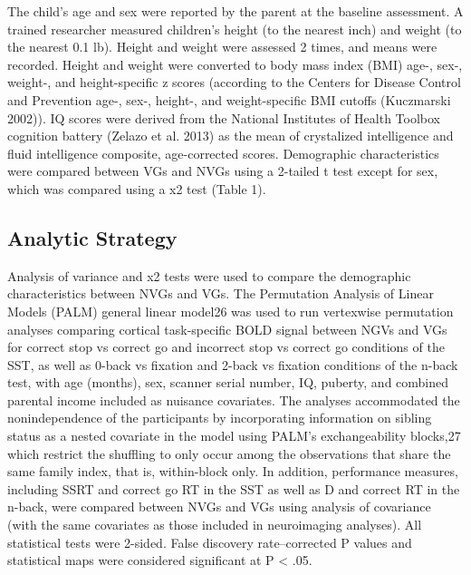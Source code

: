 \documentclass{article}
\begin{document}
The child's age and sex were reported by the parent at the baseline
assessment. A trained researcher measured children's height (to the
nearest inch) and weight (to the nearest 0.1 lb). Height and weight were
assessed 2 times, and means were recorded. Height and weight were
converted to body mass index (BMI) age-, sex-, weight-, and
height-specific z scores (according to the Centers for Disease Control
and Prevention age-, sex-, height-, and weight-specific BMI cutoffs
(Kuczmarski 2002)). IQ scores were derived from the National Institutes
of Health Toolbox cognition battery (Zelazo et al. 2013) as the mean of
crystalized intelligence and fluid intelligence composite, age-corrected
scores. Demographic characteristics were compared between VGs and NVGs
using a 2-tailed t test except for sex, which was compared using a x2
test (Table 1).

\hypertarget{analytic-strategy}{%
\subsection{Analytic Strategy}\label{analytic-strategy}}

Analysis of variance and x2 tests were used to compare the demographic
characteristics between NVGs and VGs. The Permutation Analysis of Linear
Models (PALM) general linear model26 was used to run vertexwise
permutation analyses comparing cortical task-specific BOLD signal
between NGVs and VGs for correct stop vs correct go and incorrect stop
vs correct go conditions of the SST, as well as 0-back vs fixation and
2-back vs fixation conditions of the n-back test, with age (months),
sex, scanner serial number, IQ, puberty, and combined parental income
included as nuisance covariates. The analyses accommodated the
nonindependence of the participants by incorporating information on
sibling status as a nested covariate in the model using PALM's
exchangeability blocks,27 which restrict the shuffling to only occur
among the observations that share the same family index, that is,
within-block only. In addition, performance measures, including SSRT and
correct go RT in the SST as well as D and correct RT in the n-back, were
compared between NVGs and VGs using analysis of covariance (with the
same covariates as those included in neuroimaging analyses). All
statistical tests were 2-sided. False discovery rate--corrected P values
and statistical maps were considered significant at P \textless{} .05.
\end{document}
